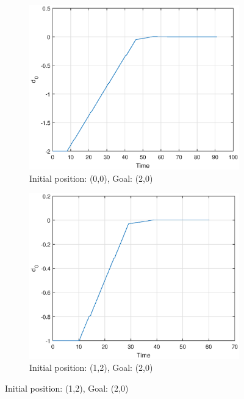 \begin{figure}[H]
    \centering
    \begin{subfigure}[b]{7cm}
        \includegraphics[width=\textwidth]{task8_d0_initial_00_Goal_20.eps}
        \caption{Initial position: (0,0), Goal: (2,0)}
        \label{fig:d00020}
    \end{subfigure}
    \begin{subfigure}[b]{7cm}
        \includegraphics[width=\textwidth]{task8_d0_initial_12_Goal_20.eps}
        \caption{Initial position: (1,2), Goal: (2,0) }
        \label{fig:d01220}
    \end{subfigure}
   

\end{figure}
